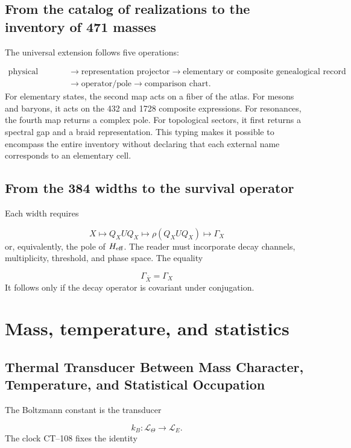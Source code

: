 \subsection{From the catalog of realizations to the inventory of 471 masses}
The universal extension follows five operations:

\[
\begin{aligned}
 \text{physical identity}
 &\longrightarrow
 \text{representation projector}
 \longrightarrow
 \text{elementary or composite genealogical record}\\
 &\longrightarrow
 \text{operator/pole}
 \longrightarrow
 \text{comparison chart}.
\end{aligned}
\]
For elementary states, the second map acts on a fiber of the atlas. For mesons and baryons, it acts on the 432 and 1728 composite expressions. For resonances, the fourth map returns a complex pole. For topological sectors, it first returns a spectral gap and a braid representation. This typing makes it possible to encompass the entire inventory without declaring that each external name corresponds to an elementary cell.

\subsection{From the 384 widths to the survival operator}
Each width requires

\[
 X\longmapsto Q_XUQ_X
 \longmapsto \rho(Q_XUQ_X)
 \longmapsto\Gamma_X
\]
or, equivalently, the pole of \(H_{\rm eff}\). The reader must incorporate decay channels, multiplicity, threshold, and phase space. The equality

\[
 \Gamma_{\bar X}=\Gamma_X
\]
It follows only if the decay operator is covariant under conjugation.

\section{Mass, temperature, and statistics}
\subsection{Thermal Transducer Between Mass Character, Temperature, and Statistical Occupation}
The Boltzmann constant is the transducer

\[
 k_B:\mathcal L_\Theta\longrightarrow\mathcal L_E.
\]
The clock CT--108 fixes the identity

